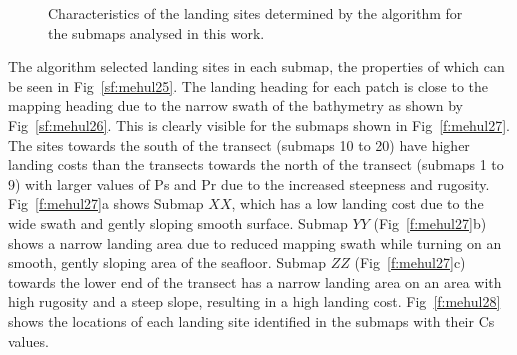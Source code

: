 \begin{figure}[!ht]
\centering
{}\quad
{}
\caption{Characteristics of the landing sites determined by the algorithm for the submaps analysed in this work.}
\end{figure}

The algorithm selected landing sites in each submap, the properties of which can be seen in Fig~\ref{sf:mehul25}. The landing heading for each patch is close to the mapping heading due to the narrow swath of the bathymetry as shown by Fig~\ref{sf:mehul26}. This is clearly visible for the submaps shown in Fig~\ref{f:mehul27}. The sites towards the south of the transect (submaps 10 to 20) have higher landing costs than the transects towards the north of the transect (submaps 1 to 9) with larger values of Ps and Pr due to the increased steepness and rugosity. Fig~\ref{f:mehul27}a shows Submap $XX$, which has a low landing cost due to the wide swath and gently sloping smooth surface. Submap $YY$ (Fig~\ref{f:mehul27}b) shows a narrow landing area due to reduced mapping swath while turning on an smooth, gently sloping area of the seafloor. Submap $ZZ$ (Fig~\ref{f:mehul27}c) towards the lower end of the transect has a narrow landing area on an area with high rugosity and a steep slope, resulting in a high landing cost. Fig~\ref{f:mehul28} shows the locations of each landing site identified in the submaps with their Cs values.

